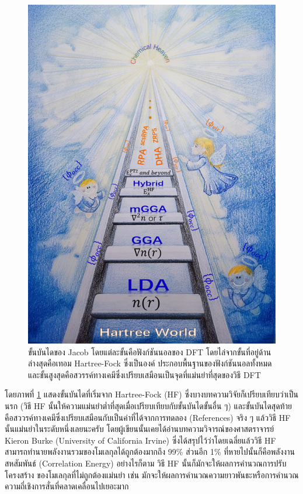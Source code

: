 \begin{figure}[htbp]
    \centering
    \includegraphics[width=0.9\linewidth]{fig/jacob_ladder.jpg}
    \caption{ขั้นบันไดของ Jacob โดยแต่ละขั้นคือฟังก์ชันนอลของ DFT โดยไล่จากขั้นที่อยู่ด้านล่างสุดคือเทอม Hartree-Fock ซึ่งเป็นองค์%
        ประกอบพื้นฐานของฟังก์ชันนอลทั้งหมดและขั้นสูงสุดคือสวรรค์ทางเคมีซึ่งเปรียบเสมือนเป็นจุดที่แม่นยำที่สุดของวิธี DFT}
    \label{fig:jacob_ladder}
\end{figure}

โดยภาพที่ \ref{fig:jacob_ladder} แสดงขั้นบันไดที่เริ่มจาก Hartree-Fock (HF) ซึ่งบางบทความวิจัยก็เปรียบเทียบว่าเป็นนรก (วิธี HF
นั้นให้ความแม่นยำต่ำที่สุดเมื่อเปรียบเทียบกับขั้นบันไดขั้นอื่น ๆ) และขั้นบันไดสุดท้ายคือสววรค์ทางเคมีซึ่งเปรียบเสมือนกับเป็นค่าที่ได้จากการทดลอง
(References) จริง ๆ แล้ววิธี HF นั้นแม่นยำในระดับหนึ่งเลยนะครับ โดยผู้เขียนนั้นเคยได้อ่านบทความวิจารณ์ของศาสตราจารย์ Kieron Burke
(University of California Irvine) ซึ่งได้สรุปไว้ว่าโดยเฉลี่ยแล้ววิธี HF สามารถทำนายพลังงานรวมของโมเลกุลได้ถูกต้องมากถึง 99\%
ส่วนอีก 1\% ที่หายไปนั้นก็คือพลังงานสหสัมพันธ์ (Correlation Energy) อย่างไรก็ตาม วิธี HF นั้นก็มักจะให้ผลการคำนวณการปรับโครงสร้าง%
ของโมเลกุลที่ไม่ถูกต้องแม่นยำ เช่น มักจะให้ผลการคำนวณความยาวพันธะหรือการคำนวณความถี่เชิงการสั่นที่คลาดเคลื่อนไปเยอะมาก

